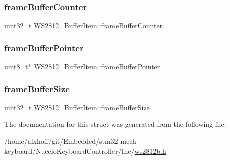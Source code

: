 \subsubsection{\texorpdfstring{frame\+Buffer\+Counter}{frameBufferCounter}}
{\footnotesize\ttfamily uint32\+\_\+t W\+S2812\+\_\+\+Buffer\+Item\+::frame\+Buffer\+Counter}

\mbox{\label{structWS2812__BufferItem_ad2ae2e339fd2d30ebecca7b607e4c5fc}} 
\subsubsection{\texorpdfstring{frame\+Buffer\+Pointer}{frameBufferPointer}}
{\footnotesize\ttfamily uint8\+\_\+t$\ast$ W\+S2812\+\_\+\+Buffer\+Item\+::frame\+Buffer\+Pointer}

\mbox{\label{structWS2812__BufferItem_a038392b39bb54dcd9a9ff52877ce239d}} 
\subsubsection{\texorpdfstring{frame\+Buffer\+Size}{frameBufferSize}}
{\footnotesize\ttfamily uint32\+\_\+t W\+S2812\+\_\+\+Buffer\+Item\+::frame\+Buffer\+Size}



The documentation for this struct was generated from the following file\+:\begin{DoxyCompactItemize}
\item 
/home/alxhoff/git/\+Embedded/stm32-\/mech-\/keyboard/\+Nucelo\+Keyboard\+Controller/\+Inc/\hyperlink{ws2812b_8h}{ws2812b.\+h}\end{DoxyCompactItemize}

